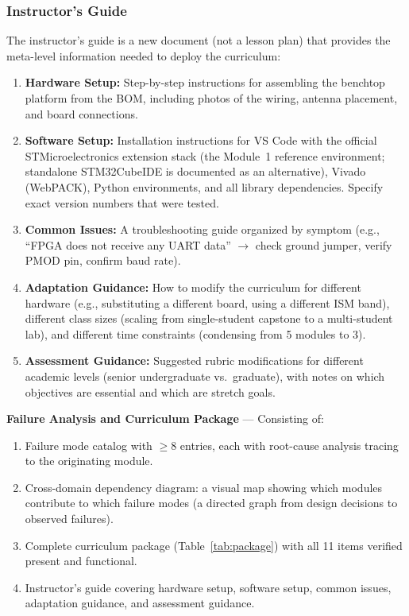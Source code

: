 \documentclass[11pt,letterpaper]{article}
\begin{document}
	\subsubsection{Instructor's Guide}

	The instructor's guide is a new document (not a lesson plan) that provides the meta-level information needed to deploy the curriculum:

	\begin{enumerate}[leftmargin=2em]
		\item \textbf{Hardware Setup:} Step-by-step instructions for assembling the benchtop platform from the BOM, including photos of the wiring, antenna placement, and board connections.
		\item \textbf{Software Setup:} Installation instructions for VS Code with the official STMicroelectronics extension stack (the Module~1 reference environment; standalone STM32CubeIDE is documented as an alternative), Vivado (WebPACK), Python environments, and all library dependencies. Specify exact version numbers that were tested.
		\item \textbf{Common Issues:} A troubleshooting guide organized by symptom (e.g., ``FPGA does not receive any UART data'' $\to$ check ground jumper, verify PMOD pin, confirm baud rate).
		\item \textbf{Adaptation Guidance:} How to modify the curriculum for different hardware (e.g., substituting a different \FPGA{} board, using a different ISM band), different class sizes (scaling from single-student capstone to a multi-student lab), and different time constraints (condensing from 5 modules to 3).
		\item \textbf{Assessment Guidance:} Suggested rubric modifications for different academic levels (senior undergraduate vs.\ graduate), with notes on which objectives are essential and which are stretch goals.
	\end{enumerate}

	\begin{tcolorbox}[deliverable={Session 19 Deliverable}]
		\textbf{Failure Analysis and Curriculum Package} --- Consisting of:
		\begin{enumerate}
			\item Failure mode catalog with $\geq$8 entries, each with root-cause analysis tracing to the originating module.
			\item Cross-domain dependency diagram: a visual map showing which modules contribute to which failure modes (a directed graph from design decisions to observed failures).
			\item Complete curriculum package (Table~\ref{tab:package}) with all 11 items verified present and functional.
			\item Instructor's guide covering hardware setup, software setup, common issues, adaptation guidance, and assessment guidance.
		\end{enumerate}
	\end{tcolorbox}
\end{document}
